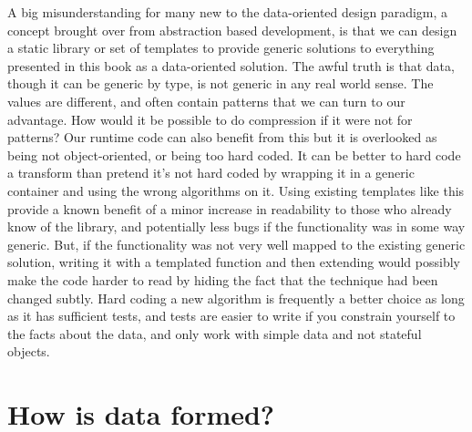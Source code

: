 A big misunderstanding for many new to the data-oriented design paradigm,
a concept brought over from abstraction based development, is that we can
design a static library or set of templates to provide generic solutions to
everything presented in this book as a data-oriented solution. The awful truth
is that data, though it can be generic by type, is not generic in any real
world sense. The values are different, and often contain patterns that we can
turn to our advantage. How would it be possible to do compression if it were
not for patterns? Our runtime code can also benefit from this but it is
overlooked as being not object-oriented, or being too hard coded. It can be
better to hard code a transform than pretend it's not hard coded by wrapping it
in a generic container and using the wrong algorithms on it. Using existing
templates like this provide a known benefit of a minor increase in readability
to those who already know of the library, and potentially less bugs if the
functionality was in some way generic. But, if the functionality was not very
well mapped to the existing generic solution, writing it with a templated
function and then extending would possibly make the code harder to read by
hiding the fact that the technique had been changed subtly. Hard coding a new
algorithm is frequently a better choice as long as it has sufficient tests, and
tests are easier to write if you constrain yourself to the facts about the
data, and only work with simple data and not stateful objects.

\section{How is data formed?}

